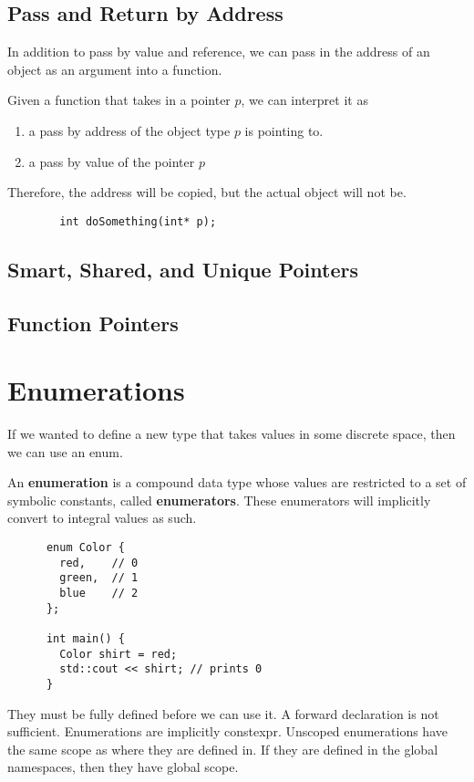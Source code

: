 \documentclass{article}
\begin{document}
  \subsection{Pass and Return by Address} 

    In addition to pass by value and reference, we can pass in the address of an object as an argument into a function. 

    \begin{definition}
      Given a function that takes in a pointer $p$, we can interpret it as 
      \begin{enumerate}
        \item a pass by address of the object type $p$ is pointing to. 
        \item a pass by value of the pointer $p$
      \end{enumerate}
      Therefore, the address will be copied, but the actual object will not be. 

      \begin{lstlisting}
        int doSomething(int* p);  
      \end{lstlisting}
    \end{definition}  

  \subsection{Smart, Shared, and Unique Pointers} 

  \subsection{Function Pointers}

\section{Enumerations} 

  If we wanted to define a new type that takes values in some discrete space, then we can use an enum. 

  \begin{definition}
    An \textbf{enumeration} is a compound data type whose values are restricted to a set of symbolic constants, called \textbf{enumerators}. These enumerators will implicitly convert to integral values as such. 
    \begin{lstlisting}
      enum Color {
        red,    // 0
        green,  // 1 
        blue    // 2
      };

      int main() {
        Color shirt = red; 
        std::cout << shirt; // prints 0
      }
    \end{lstlisting}
    They must be fully defined before we can use it. A forward declaration is not sufficient. Enumerations are implicitly constexpr. Unscoped enumerations have the same scope as where they are defined in. If they are defined in the global namespaces, then they have global scope. 
  \end{definition}
\end{document}
